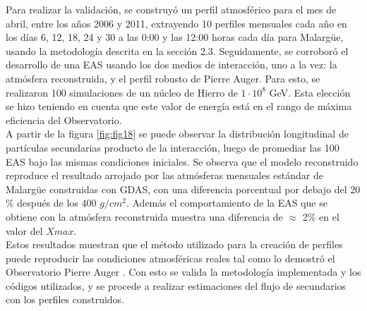 Para realizar la validación, se construyó un perfil atmosférico para el mes de abril, entre los años 2006 y 2011, extrayendo 10 perfiles mensuales cada año en los días 6, 12, 18, 24 y 30 a las 0:00 y las 12:00 horas cada día para Malarg\"ue, usando la metodología descrita en la sección 2.3. Seguidamente, se corroboró el desarrollo de una EAS usando los dos medios de interacción, uno a la vez: la atmósfera reconstruida, y el perfil robusto de Pierre Auger. Para esto, se realizaron 100 simulaciones de un núcleo de Hierro de $1 \cdot 10^{8}$ GeV. Esta elección se hizo teniendo en cuenta que este valor de energía está en el rango de máxima eficiencia del Observatorio. \\

A partir de la figura \ref{fig:fig18} se puede observar la distribución longitudinal de partículas secundarias producto de la interacción, luego de promediar las 100 EAS bajo las mismas condiciones iniciales. Se observa que el modelo reconstruido reproduce el resultado arrojado por las atmósferas mensuales estándar de Malarg\"ue construidas con GDAS, con una diferencia porcentual por debajo del 20$\%$ después de los 400 $g/cm^{2}$. Además el comportamiento de la EAS que se obtiene con la atmósfera reconstruida muestra una diferencia de $\approx$ 2$\%$ en el valor del $X{max}$.\\

Estos resultados muestran que el método utilizado para la creación de perfiles puede reproducir las condiciones atmosféricas reales tal como lo demostró el Observatorio Pierre Auger  \citep{GDAS_Auger}. Con esto se valida la metodología implementada y los códigos utilizados,  y se procede a realizar estimaciones del flujo de secundarios con los perfiles construidos.\\

